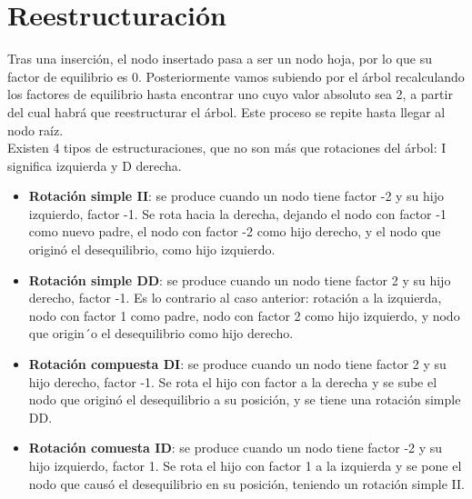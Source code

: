 \documentclass{article}
\begin{document}
\newpage

\section{Reestructuración}
Tras una inserción, el nodo insertado pasa a ser un nodo hoja, por lo que su factor de equilibrio
es 0. Posteriormente vamos subiendo por el árbol recalculando los factores de equilibrio hasta
encontrar uno cuyo valor absoluto sea 2, a partir del cual habrá que reestructurar el árbol. Este proceso se repite hasta llegar al nodo raíz. \\

Existen 4 tipos de estructuraciones, que no son más que rotaciones del árbol: I significa izquierda y D derecha.

\begin{itemize}
    \item \textbf{Rotación simple II}: se produce cuando un nodo tiene factor -2 y su hijo izquierdo, factor -1. Se rota hacia la derecha, dejando el nodo con factor -1 como nuevo padre, el nodo con factor -2 como hijo derecho, y el nodo que originó el desequilibrio, como hijo izquierdo.

    \item \textbf{Rotación simple DD}: se produce cuando un nodo tiene factor 2 y su hijo derecho, factor -1. Es lo contrario al caso anterior: rotación a la izquierda, nodo con factor 1 como padre, nodo con factor 2 como hijo izquierdo, y nodo que origin´o el desequilibrio como hijo derecho.

    \item \textbf{Rotación compuesta DI}: se produce cuando un nodo tiene factor 2 y su hijo derecho, factor -1. Se rota el hijo con factor a la derecha y se sube el nodo que originó el desequilibrio a su posición, y se tiene una rotación simple DD.

    \item \textbf{Rotación comuesta ID}: se produce cuando un nodo tiene factor -2 y su hijo izquierdo, factor 1. Se rota el hijo con factor 1 a la izquierda y se pone el nodo que causó el desequilibrio en su posición, teniendo un rotación simple II.
\end{itemize}
\end{document}
